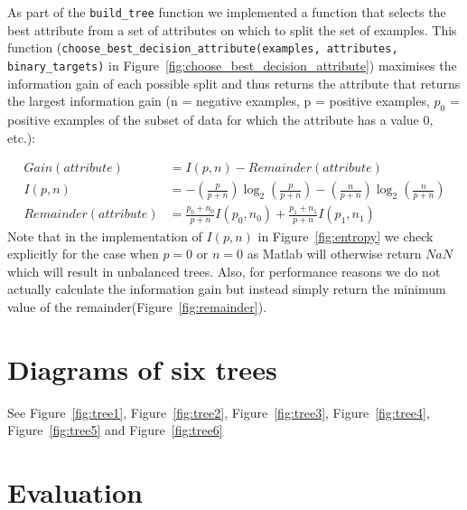 \documentclass[10pt,a4paper]{article}
\begin{document}
As part of the \texttt{build\_tree} function we implemented a function that selects the best attribute from a set of attributes on which to split the set of examples. This function (\texttt{choose\-\_best\-\_decision\-\_attribute(examples, attributes, binary\_targets)} in Figure~\ref{fig:choose_best_decision_attribute}) maximises the information gain of each possible split and thus returns the attribute that returns the largest information gain (n = negative examples, p = positive examples, $p_0$ = positive examples of the subset of data for which the attribute has a value 0, etc.):

\begin{align}
Gain(attribute)  &= I(p,n) - Remainder(attribute)\\
I(p,n) &= -\left(\frac{p}{p+n}\right)\log_2{\left(\frac{p}{p+n}\right)} -\left(\frac{n}{p+n}\right)\log_2{\left(\frac{n}{p+n}\right)}\\
Remainder(attribute) &= \frac{p_0 + n_0}{p+n}I(p_0,n_0) + \frac{p_1 + n_1}{p + n}I(p_1,n_1)
\end{align}
Note that in the implementation of $I(p,n)$ in Figure~\ref{fig:entropy} we check explicitly for the case when $p = 0$ or $n = 0$ as Matlab will otherwise return $NaN$ which will result in unbalanced trees. Also, for performance reasons we do not actually calculate the information gain but instead simply return the minimum value of the remainder(Figure~\ref{fig:remainder}).


\section{Diagrams of six trees}
See Figure~\ref{fig:tree1}, Figure~\ref{fig:tree2}, Figure~\ref{fig:tree3}, Figure~\ref{fig:tree4}, Figure~\ref{fig:tree5} and Figure~\ref{fig:tree6}


\section{Evaluation}
\end{document}
